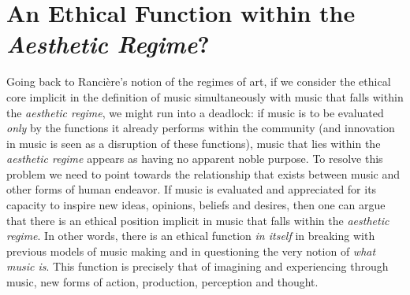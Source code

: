 \section{An Ethical Function within the \emph{Aesthetic Regime}?}

Going back to Ranci\`{e}re's notion of the regimes of art, if we consider the ethical core implicit in the definition of music simultaneously with music that falls within the \emph{aesthetic regime}, we might run into a deadlock: if music is to be evaluated \emph{only} by the functions it already performs within the community (and innovation in music is seen as a disruption of these functions), music that lies within the \emph{aesthetic regime} appears as having no apparent noble purpose. To resolve this problem we need to point towards the relationship that exists between music and other forms of human endeavor. If music is evaluated and appreciated for its capacity to inspire new ideas, opinions, beliefs and desires, then one can argue that there is an ethical position implicit in music that falls within the \emph{aesthetic regime}. In other words, there is an ethical function \emph{in itself} in breaking with previous models of music making and in questioning the very notion of \emph{what music is}. This function is precisely that of imagining and experiencing through music, new forms of action, production, perception and thought.

